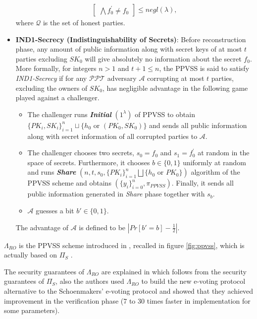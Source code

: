 \begin{itemize}
\begin{align*}
\begin{bmatrix}
            \bigwedge f_0^{'}\neq f_0
          \end{bmatrix} \leq negl(\lambda),
        \end{align*}
        where $\mathcal{Q}$ is the set of honest parties.
  \item \textbf{IND1-Secrecy (Indistinguishability of Secrets)}: Before reconstruction phase, any amount of public 
    information along with secret keys of at most $t$ parties excluding $SK_0$ will give 
    absolutely no information about the secret $f_0$. More formally, for integers $n>1$ and 
    $t+1\leq n$, the PPVSS is said to satisfy \textit{IND1-Secrecy} if for any $\mathcal{PPT}$ adversary $\mathcal{A}$ 
    corrupting at most $t$ parties, excluding the owners of $SK_0$, has negligible 
    advantage in the following game played against a challenger.
    \begin{itemize}
      \item The challenger runs \textit{\textbf{Initial}} $(1^\lambda)$ of PPVSS to obtain 
        $\{PK_i,SK_i\}_{i=1}^n\sqcup\{h_0\text{ or }(PK_0,SK_0)\}$ and sends all public 
        information along with secret information of all corrupted parties to $\mathcal{A}$.
      \item The challenger chooses two secrets, $s_0=f_0$ and 
        $s_1=f_0^{'}$ at random in the space of secrets. Furthermore, it chooses $b\in\{0,1\}$ 
        uniformly at random and runs 
        \textit{\textbf{Share}} $(n,t,s_0,\{PK_i\}_{i=1}^n\bigsqcup\{h_0\text{ or }PK_0\})$ 
        algorithm of the PPVSS scheme and obtains $(\{y_i\}_{i=0}^n,\pi_{PPVSS})$. Finally, it 
        sends all public information generated in \textit{Share} phase together with $s_b$.
      \item $\mathcal{A}$ guesses a bit $b'\in\{0,1\}$.
    \end{itemize}
    The advantage of $\mathcal{A}$ is defined to be $|Pr[b'=b]-\frac{1}{2}|$.
\end{itemize}

$\Lambda_{RO}$ is the PPVSS scheme introduced in \cite{cryptoeprint:2025/576}, recalled in 
figure \ref{fig:ppvss}, which is actually based on $\Pi_S$ \cite{cryptoeprint:2023/1669}.\par 

The security guarantees of $\Lambda_{RO}$ are explained in \cite{cryptoeprint:2025/576} which follows from 
the security guarantees of $\Pi_S$, also the authors used $\Lambda_{RO}$ to build the new e-voting 
protocol alternative to the Schoenmakers' e-voting protocol \cite{5581ccd9530540479539d21d1d39ae96} 
and showed that they achieved improvement in the verification phase 
(7 to 30 times faster in implementation for some parameters). 

